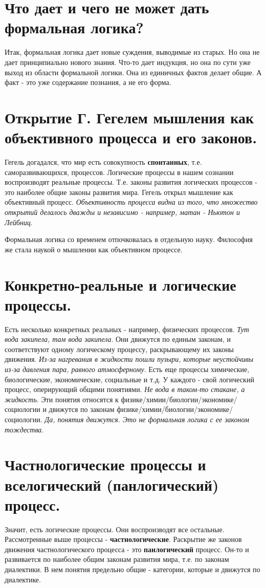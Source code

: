 \section{ Что дает и чего не может дать формальная логика?}
Итак, формальная логика дает новые суждения, выводимые из старых. Но она не дает принципиально нового знания. Что-то дает индукция, но она по сути уже выход из области формальной логики. Она из единичных фактов делает общие. А факт - это уже содержание познания, а не его форма.

\section{ Открытие Г. Гегелем мышления как объективного процесса и его законов.}
Гегель догадался, что мир есть совокупность \textbf{спонтанных}, т.е. саморазвивающихся, процессов.
Логические процессы в нашем сознании воспроизводят реальные процессы. Т.е. законы развития логических процессов - это наиболее общие законы развития мира.
Гегель открыл мышление как  объективный процесс. \textit{Объективность процесса видна из того, что множество открытий делалось дважды и независимо - например, матан - Ньютон и Лейбниц}. 

Формальная логика со временем отпочковалась в отдельную науку. Философия же стала наукой о мышлении как объективном процессе. 

\section{ Конкретно-реальные и логические процессы.}
Есть несколько конкретных реальных - например, физических процессов. \textit{Тут вода закипела, там вода закипела}. Они движутся по единым законам, и соответствуют одному логическому процессу, раскрывающему их законы движения. \textit{Из-за нагревания в жидкости пошли пузыри, которые неустойчивы из-за давления пара, равного атмосферному}. Есть еще процессы химические, биологические, экономические, социальные и т.д. У каждого - свой логический процесс, оперирующий общими понятиями. \textit{Не вода в таком-то стакане, а жидкость}. Эти понятия относятся к физике/химии/биологии/экономике/социологии и движутся по законам физике/химии/биологии/экономике/социологии.
\textit{Да, понятия движутся. Это не формальная логика с ее законом тождества.}
 
\section{ Частнологические процессы и вселогический (панлогический) процесс.}
Значит, есть логические процессы. Они воспроизводят все остальные.
Рассмотренные выше процессы - \textbf{частнологические}. Раскрытие же законов движения частнологического процесса - это \textbf{панлогический} процесс. Он-то и развивается по наиболее общим законам развития мира, т.е. по законам диалектики. В нем понятия предельно общие - категории, которые и движутся по диалектике.

